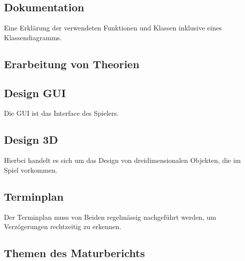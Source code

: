 \documentclass[a4paper]{article}
\begin{document}

\subsection{Dokumentation}

Eine Erklärung der verwendeten Funktionen und Klassen inklusive eines Klassendiagramms.


\subsection{Erarbeitung von Theorien}



\subsection{Design GUI}
Die GUI ist das Interface des Spielers.


\subsection{Design 3D}
Hierbei handelt es sich um das Design von dreidimensionalen Objekten, die im Spiel vorkommen.


\subsection{Terminplan}
Der Terminplan muss von Beiden regelmässig nachgeführt werden, um Verzögerungen rechtzeitig zu erkennen.


\subsection{Themen des Maturberichts}
\end{document}
